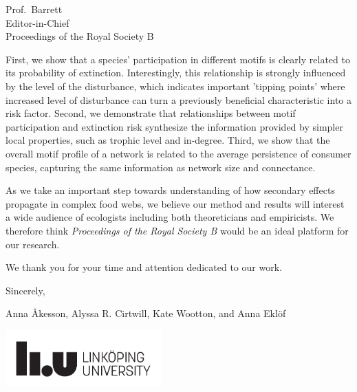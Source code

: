 \documentclass[10.5pt]{letter}
\begin{document}
\begin{letter}{
\vspace{-2.5cm}

Prof.~Barrett\\
Editor-in-Chief\\
Proceedings of the Royal Society B}
First, we show that a species' participation in different motifs is clearly related to its probability of extinction. Interestingly, this relationship is strongly influenced by the level of the disturbance, which indicates important 'tipping points' where increased level of disturbance can turn a previously beneficial characteristic into a risk factor. 
Second, we demonstrate that relationships between motif participation and extinction risk synthesize the information provided by simpler local properties, such as trophic level and in-degree. 
Third, we show that the overall motif profile of a network is related to the average persistence of consumer species, capturing the same information as network size and connectance. 

As we take an important step towards understanding of how secondary effects propagate in complex food webs, we believe our method and results will interest a wide audience of ecologists including both theoreticians and empiricists. We therefore think \emph{ Proceedings of the Royal Society B} would be an ideal platform for our research.

We thank you for your time and attention dedicated to our work.


\vspace{2\parskip}

\hspace{4\parskip} Sincerely,

\hspace{4\parskip} Anna {\AA}kesson, Alyssa R. Cirtwill, Kate Wootton, and Anna Ekl\"of

\vspace{4\parskip}
\centering
\includegraphics[width=60mm]{manuscript/figures/LiU_primary_black.pdf}


\end{letter} 
\end{document}
